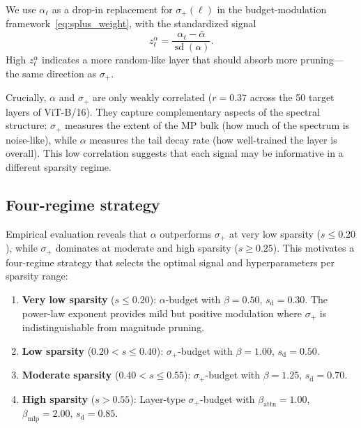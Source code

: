 \documentclass[11pt]{article}
\theoremstyle{plain}
\theoremstyle{definition}
\theoremstyle{remark}
\newcommand{\1}{\mathbf{1}}
\begin{document}
We use \(\alpha_\ell\) as a drop-in replacement for \(\sigma_+(\ell)\) in the budget-modulation framework~\eqref{eq:splus_weight}, with the standardized signal
\[
z_\ell^\alpha = \frac{\alpha_\ell - \bar{\alpha}}{\operatorname{sd}(\alpha)}.
\]
High \(z_\ell^\alpha\) indicates a more random-like layer that should absorb more pruning---the same direction as \(\sigma_+\).

Crucially, \(\alpha\) and \(\sigma_+\) are only weakly correlated (\(r=0.37\) across the 50 target layers of ViT-B/16).  They capture complementary aspects of the spectral structure: \(\sigma_+\) measures the extent of the MP bulk (how much of the spectrum is noise-like), while \(\alpha\) measures the tail decay rate (how well-trained the layer is overall).  This low correlation suggests that each signal may be informative in a different sparsity regime.

\subsection{Four-regime strategy}
\label{subsec:four_regime}

Empirical evaluation reveals that \(\alpha\) outperforms \(\sigma_+\) at very low sparsity (\(s \le 0.20\)), while \(\sigma_+\) dominates at moderate and high sparsity (\(s \ge 0.25\)).  This motivates a four-regime strategy that selects the optimal signal and hyperparameters per sparsity range:

\begin{enumerate}[leftmargin=2em]
\item \textbf{Very low sparsity} (\(s \le 0.20\)):  \(\alpha\)-budget with \(\beta=0.50\), \(s_{\mathrm{d}}=0.30\).  The power-law exponent provides mild but positive modulation where \(\sigma_+\) is indistinguishable from magnitude pruning.

\item \textbf{Low sparsity} (\(0.20 < s \le 0.40\)):  \(\sigma_+\)-budget with \(\beta=1.00\), \(s_{\mathrm{d}}=0.50\).

\item \textbf{Moderate sparsity} (\(0.40 < s \le 0.55\)):  \(\sigma_+\)-budget with \(\beta=1.25\), \(s_{\mathrm{d}}=0.70\).

\item \textbf{High sparsity} (\(s > 0.55\)):  Layer-type \(\sigma_+\)-budget with \(\beta_{\mathrm{attn}}=1.00\), \(\beta_{\mathrm{mlp}}=2.00\), \(s_{\mathrm{d}}=0.85\).
\end{enumerate}
\end{document}

